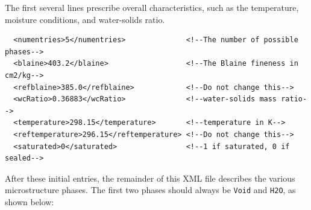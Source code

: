 \documentclass{article}
\begin{document}
The first several lines prescribe overall characteristics, such as the
temperature, moisture conditions, and water-solids ratio.

\scriptsize{
\begin{lstlisting}
  <numentries>5</numentries>              <!--The number of possible phases-->
  <blaine>403.2</blaine>                  <!--The Blaine fineness in cm2/kg-->
  <refblaine>385.0</refblaine>            <!--Do not change this-->
  <wcRatio>0.36883</wcRatio>              <!--water-solids mass ratio-->
  <temperature>298.15</temperature>       <!--temperature in K-->
  <reftemperature>296.15</reftemperature> <!--Do not change this-->
  <saturated>0</saturated>                <!--1 if saturated, 0 if sealed-->
\end{lstlisting}
}

\normalsize{ }

After these initial entries, the remainder of this XML file describes the various
microstructure phases.  The first two phases should always be \verb!Void! and
\verb!H2O!, as shown below:
\end{document}
